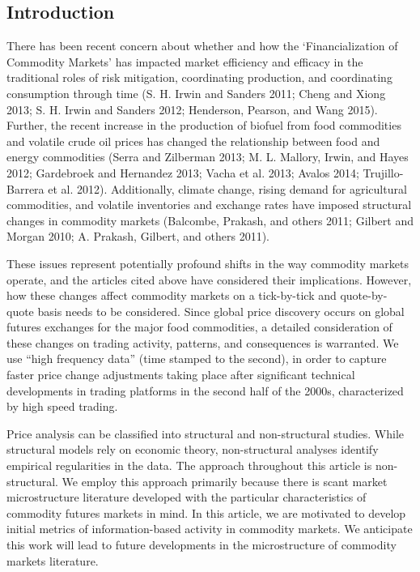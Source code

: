 \documentclass[review,12pt]{elsarticle}
\begin{document}
\begin{linenumbers}

\section{Introduction}\label{introduction}

There has been recent concern about whether and how the
`Financialization of Commodity Markets' has impacted market efficiency
and efficacy in the traditional roles of risk mitigation, coordinating
production, and coordinating consumption through time (S. H. Irwin and
Sanders 2011; Cheng and Xiong 2013; S. H. Irwin and Sanders 2012;
Henderson, Pearson, and Wang 2015). Further, the recent increase in the
production of biofuel from food commodities and volatile crude oil
prices has changed the relationship between food and energy commodities
(Serra and Zilberman 2013; M. L. Mallory, Irwin, and Hayes 2012;
Gardebroek and Hernandez 2013; Vacha et al. 2013; Avalos 2014;
Trujillo-Barrera et al. 2012). Additionally, climate change, rising
demand for agricultural commodities, and volatile inventories and
exchange rates have imposed structural changes in commodity markets
(Balcombe, Prakash, and others 2011; Gilbert and Morgan 2010; A.
Prakash, Gilbert, and others 2011).

These issues represent potentially profound shifts in the way commodity
markets operate, and the articles cited above have considered their
implications. However, how these changes affect commodity markets on a
tick-by-tick and quote-by-quote basis needs to be considered. Since
global price discovery occurs on global futures exchanges for the major
food commodities, a detailed consideration of these changes on trading
activity, patterns, and consequences is warranted. We use ``high
frequency data'' (time stamped to the second), in order to capture
faster price change adjustments taking place after significant technical
developments in trading platforms in the second half of the 2000s,
characterized by high speed trading.

Price analysis can be classified into structural and non-structural
studies. While structural models rely on economic theory, non-structural
analyses identify empirical regularities in the data. The approach
throughout this article is non-structural. We employ this approach
primarily because there is scant market microstructure literature
developed with the particular characteristics of commodity futures
markets in mind. In this article, we are motivated to develop initial
metrics of information-based activity in commodity markets. We
anticipate this work will lead to future developments in the
microstructure of commodity markets literature.


\end{linenumbers}
\end{document}
